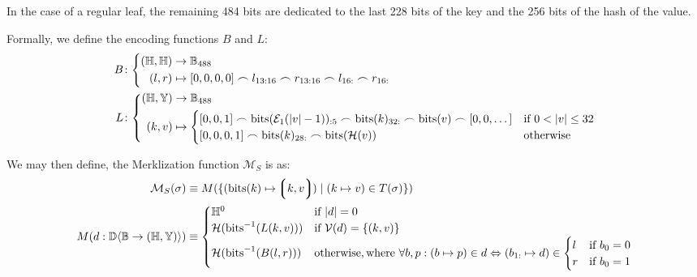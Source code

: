 In the case of a regular leaf, the remaining 484 bits are dedicated to the last 228 bits of the key and the 256 bits of the hash of the value.

Formally, we define the encoding functions $B$ and $L$:
\begin{align}
  B&\colon\left\{\begin{aligned}
    (\H, \H) &\to \mathbb{B}_{488}\\
    (l, r) &\mapsto [0, 0, 0, 0] \frown l_{13:16} \frown r_{13:16} \frown l_{16:} \frown r_{16:}
  \end{aligned}\right.\\
  L&\colon\left\{\begin{aligned}
    (\H, \Y) &\to \mathbb{B}_{488}\\
    (k, v) &\mapsto \begin{cases}
      [0, 0, 1] \frown \text{bits}(\se_1(|v| - 1))_{:5} \frown \text{bits}(k)_{32:} \frown \text{bits}(v) \frown [0, 0, \dots] &\when 0 < |v| \le 32\\
      [0, 0, 0, 1] \frown \text{bits}(k)_{28:} \frown \text{bits}(\mathcal{H}(v)) &\otherwise
    \end{cases}
  \end{aligned}\right.
\end{align}

We may then define, the Merklization function $\mathcal{M}_S$ is as:
\begin{align}
  \mathcal{M}_S(\sigma) &\equiv M(\{ (\text{bits}(k) \mapsto \tup{k, v}) \mid (k \mapsto v) \in T(\sigma) \})\\
  M(d: \dict{\mathbb{B}}{(\H, \Y)}) &\equiv \begin{cases}
    \H^0 &\when |d| = 0\\
    \mathcal{H}(\text{bits}^{-1}(L(k, v))) &\when \mathcal{V}(d) = \{ (k, v) \}\\
    \mathcal{H}(\text{bits}^{-1}(B(l, r))) &\otherwise, \where \forall b, p: (b \mapsto p) \in d \Leftrightarrow (b_{1:} \mapsto d) \in \begin{cases}
      l &\when b_0 = 0 \\
      r &\when b_0 = 1
    \end{cases}
  \end{cases}
\end{align}

